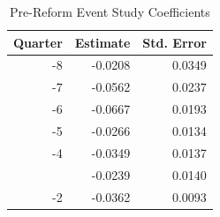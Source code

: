 \begin{table}[!h]
\centering
\caption{\label{tab:tab:pretrends}Pre-Reform Event Study Coefficients}
\centering
\begin{tabular}[t]{rrr}
\toprule
Quarter & Estimate & Std. Error\\
\midrule
-8 & -0.0208 & 0.0349\\
-7 & -0.0562 & 0.0237\\
-6 & -0.0667 & 0.0193\\
-5 & -0.0266 & 0.0134\\
-4 & -0.0349 & 0.0137\\
\addlinespace
-3 & -0.0239 & 0.0140\\
-2 & -0.0362 & 0.0093\\
\bottomrule
\end{tabular}
\end{table}
